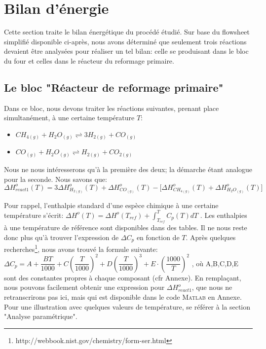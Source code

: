 \documentclass[11pt,a4paper]{report}
\author{Groupe 1246}
\begin{document}
\section*{Bilan d'énergie}

Cette section traite le bilan énergétique du procédé étudié.
Sur base du flowsheet simplifié disponible ci-après, nous avons déterminé que seulement trois réactions
devaient être analysées pour réaliser un tel bilan: celle se produisant dans le bloc du four et celles dans 
le réacteur du reformage primaire.

\subsection*{Le bloc "Réacteur de reformage primaire"}

Dans ce bloc, nous devons traiter les réactions suivantes, prenant place simultanément, à une certaine température $T$:

\begin{itemize}
\item{$CH_{4(g)} + H_{2}O_{(g)} \rightleftharpoons  3H_{2(g)} + CO_{(g)}$}
\item{$CO_{(g)} + H_{2}O_{(g)} \rightleftharpoons  H_{2(g)} + CO_{2(g)}$}
\end{itemize}

\bigbreak
Nous ne nous intéresserons qu'à la première des deux; la démarche étant analogue pour la seconde. Nous savons que:
$$\Delta H^o_{react1}(T)=3\Delta H^o_{H_{2(g)}}(T) + \Delta H^o_{CO_{(g)}}(T) - \lbrack\Delta H^o_{CH_{4(g)}}(T) + 
\Delta H^o_{H_{2}O_{(g)}}(T)\rbrack$$

Pour rappel, l'enthalpie standard d'une espèce chimique à une certaine température s'écrit: 
$\Delta H^o(T)=\Delta H^o(T_{ref})  +\int_{T_{ref}}^{T} C_{p}(T)dT$ . Les enthalpies à une température de référence 
sont disponibles dans des tables. Il ne nous reste donc plus qu'à trouver l'expression de $\Delta C_p$ en fonction de $T$.
Après quelques recherches\footnote{http://webbook.nist.gov/chemistry/form-ser.html}, nous avons trouvé la formule 
suivante: $\Delta C_p=A+\dfrac{BT}{1000}+C(\dfrac{T}{1000})^2+D(\dfrac{T}{1000})^3+E\cdot(\dfrac{1000}{T})^2$ , 
où A,B,C,D,E sont des constantes propres à chaque composant (cfr Annexe).
En remplaçant, nous pouvons facilement obtenir une expression pour $\Delta H^o_{react1}$, que nous ne retranscrirons pas
ici, mais qui est disponible dans le code \textsc{Matlab} en Annexe. Pour une illustration avec quelques valeurs de 
température, se référer à la section "Analyse paramétrique".
\end{document}
